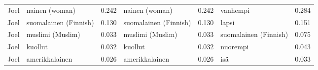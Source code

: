 \begin{longtable}{llrlrlr}
  Joel &        nainen (woman) &                            0.242 &         nainen (woman) &                                 0.242 &              vanhempi &                           0.284 \\
  Joel & suomalainen (Finnish) &                            0.130 &  suomalainen (Finnish) &                                 0.130 &                 lapsi &                           0.151 \\
  Joel &      muslimi (Muslim) &                            0.033 &       muslimi (Muslim) &                                 0.033 & suomalainen (Finnish) &                           0.075 \\
  Joel &               kuollut &                            0.032 &                kuollut &                                 0.032 &              nuorempi &                           0.043 \\
  Joel &        amerikkalainen &                            0.026 &         amerikkalainen &                                 0.026 &                   isä &                           0.033 \\
\end{longtable}
